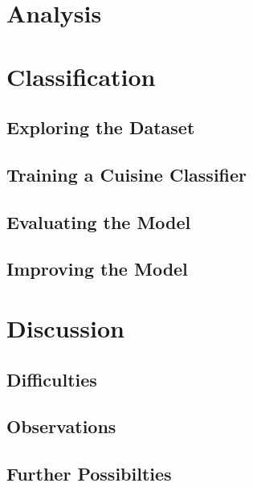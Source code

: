 \documentclass[11pt,a4paper]{article}
\begin{document}
\section{Analysis}

\section{Classification}
\subsection{Exploring the Dataset}
\subsection{Training a Cuisine Classifier}
\subsection{Evaluating the Model}
\subsection{Improving the Model}

\section{Discussion}
\subsection{Difficulties}
\subsection{Observations}
\subsection{Further Possibilties}
\end{document}
